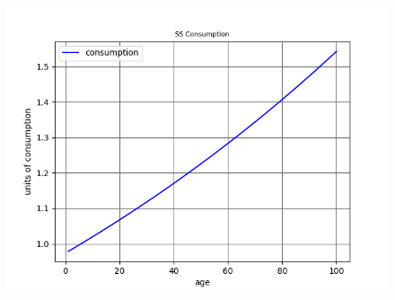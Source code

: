 \documentclass[a4paper, 12pt]{article}
\begin{document}
    \begin{figure}
	\centering
	\includegraphics[width=5in]{consumption.png}
	\caption{}
    \end{figure} 
\end{document}
